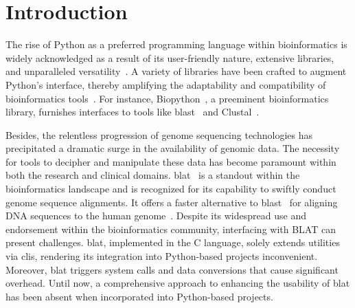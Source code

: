 \documentclass[unnumsec,webpdf,contemporary,large,namedate]{oup-authoring-template}%
\theoremstyle{thmstyleone}%
\theoremstyle{thmstyletwo}%
\theoremstyle{thmstylethree}%
\begin{document}


\maketitle


\section{Introduction}
The rise of Python as a preferred programming language within bioinformatics is widely acknowledged as a result of its user-friendly nature, extensive libraries, and unparalleled versatility~\citep{perkel2015programming}.
A variety of libraries have been crafted to augment Python's interface, thereby amplifying the adaptability and compatibility of bioinformatics tools~\citep{putri2022analysing, cock2009biopython}.
For instance, Biopython~\citep{cock2009biopython}, a preeminent bioinformatics library, furnishes interfaces to tools like \gls{blast}~\citep{altschul1990basic} and Clustal~\citep{higgins1988clustal}.

Besides, the relentless progression of genome sequencing technologies has precipitated a dramatic surge in the availability of genomic data.
The necessity for tools to decipher and manipulate these data has become paramount within both the research and clinical domains.
\gls{blat}~\citep{kent2002blat} is a standout within the bioinformatics landscape and is recognized for its capability to swiftly conduct genome sequence alignments.
It offers a faster alternative to \gls{blast}~\citep{altschul1990basic} for aligning DNA sequences to the human genome~\citep{kent2002blat}.
Despite its widespread use and endorsement within the bioinformatics community, interfacing with BLAT can present challenges.
\gls{blat}, implemented in the C language, solely extends utilities via \glspl{cli}, rendering its integration into Python-based projects inconvenient.
Moreover, \gls{blat} triggers system calls and data conversions that cause significant overhead.
Until now, a comprehensive approach to enhancing the usability of \gls{blat} has been absent when incorporated into Python-based projects.
\end{document}

